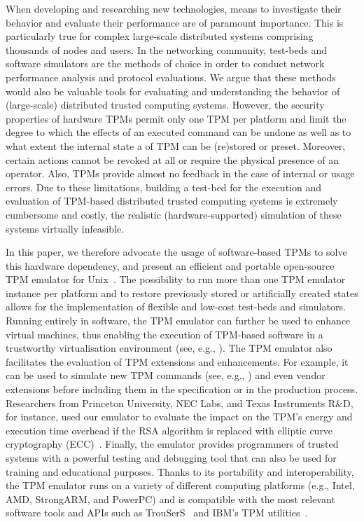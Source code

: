 \documentclass[runningheads]{llncs}
\begin{document}
When developing and researching new technologies, means to investigate their
behavior and evaluate their performance are of paramount importance. This is
particularly true for complex large-scale distributed systems comprising
thousands of nodes and users.
In the networking community, test-beds and software simulators are the methods
of choice in order to conduct network performance analysis and protocol
evaluations. We argue that these methods would also be valuable tools for
evaluating and understanding the behavior of (large-scale) distributed trusted
computing systems. However, the security properties of hardware TPMs permit
only one TPM per platform and limit the degree to which the effects of an
executed command can be undone as well as to what extent the internal state
a of TPM can be (re)stored or preset. Moreover, certain actions cannot be
revoked at all or require the physical presence of an operator. Also, TPMs
provide almost no feedback in the case of internal or usage errors. Due to
these limitations, building a test-bed for the execution and evaluation of
TPM-based distributed trusted computing systems is extremely cumbersome and
costly, the realistic (hardware-supported) simulation of these systems
virtually infeasible.

In this paper, we therefore advocate the usage of software-based TPMs to
solve this hardware dependency, and present an efficient and portable
open-source TPM emulator for Unix~\cite{TPMEmu}. The possibility to run
more than one TPM emulator instance per platform and to restore previously
stored or artificially created states allows for the implementation of
flexible and low-cost test-beds and simulators. Running entirely in software,
the TPM emulator can further be used to enhance virtual machines, thus
enabling the execution of TPM-based software in a trustworthy virtualisation
environment (see, e.g., \cite{Xen}).
The TPM emulator also facilitates the evaluation of TPM extensions and
enhancements. For example, it can be used to simulate new TPM commands
(see, e.g., \cite{Sarmenta}) and even vendor extensions before including
them in the specification or in the production process.
Researchers from Princeton University, NEC Labs, and Texas Instruments R\&D,
for instance, used our emulator to evaluate the impact on the TPM's energy
and execution time overhead if the RSA algorithm is replaced with elliptic
curve cryptography (ECC)~\cite{Aaraj}. Finally, the emulator provides
programmers of trusted systems with a powerful testing and debugging tool
that can also be used for training and educational purposes. Thanks to its
portability and interoperability, the TPM emulator runs on a variety of
different computing platforms (e.g., Intel, AMD, StrongARM, and PowerPC)
and is compatible with the most relevant software tools and APIs such as
TrouSerS~\cite{trousers} and IBM's TPM utilities~\cite{IBMtools}.
\end{document}
